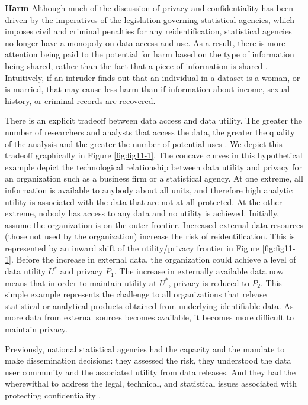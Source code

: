 \documentclass[]{krantz}
\begin{document}
\textbf{Harm} Although much of the discussion of privacy and
confidentiality has been driven by the imperatives of the legislation
governing statistical agencies, which imposes civil and criminal
penalties for any reidentification, statistical agencies no longer have
a monopoly on data access and use. As a result, there is more attention
being paid to the potential for harm based on the type of information
being shared, rather than the fact that a piece of information is shared
\citep{nissenbaum2019contextual}. Intuitively, if an intruder finds out
that an individual in a dataset is a woman, or is married, that may
cause less harm than if information about income, sexual history, or
criminal records are recovered.

There is an explicit tradeoff between data access and data utility. The
greater the number of researchers and analysts that access the data, the
greater the quality of the analysis and the greater the number of
potential uses \citep{Lane2007a}. We depict this tradeoff graphically in
Figure \ref{fig:fig11-1}. The concave curves in this hypothetical
example depict the technological relationship between data utility and
privacy for an organization such as a business firm or a statistical
agency. At one extreme, all information is available to anybody about
all units, and therefore high analytic utility is associated with the
data that are not at all protected. At the other extreme, nobody has
access to any data and no utility is achieved. Initially, assume the
organization is on the outer frontier. Increased external data resources
(those not used by the organization) increase the risk of
reidentification. This is represented by an inward shift of the
utility/privacy frontier in Figure \ref{fig:fig11-1}. Before the
increase in external data, the organization could achieve a level of
data utility \(U^*\) and privacy \(P_1\). The increase in externally
available data now means that in order to maintain utility at \(U^*\),
privacy is reduced to \(P_2\). This simple example represents the
challenge to all organizations that release statistical or analytical
products obtained from underlying identifiable data. As more data from
external sources becomes available, it becomes more difficult to
maintain privacy.

Previously, national statistical agencies had the capacity and the
mandate to make dissemination decisions: they assessed the risk, they
understood the data user community and the associated utility from data
releases. And they had the wherewithal to address the legal, technical,
and statistical issues associated with protecting confidentiality
\citep{trewin2007managing}.
\end{document}
